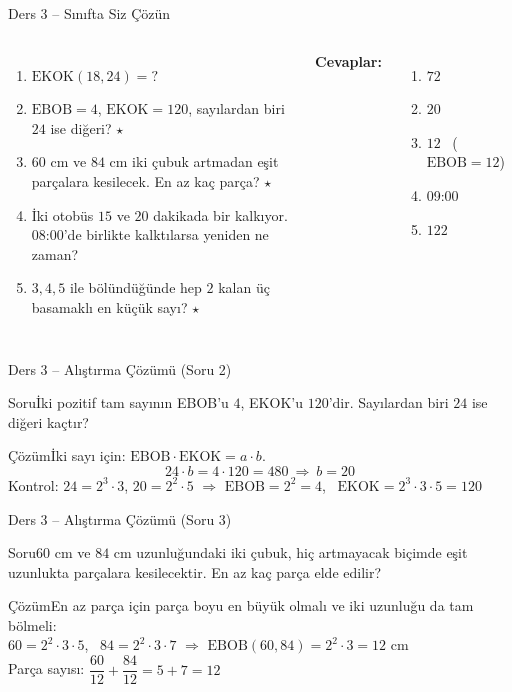 \documentclass[aspectratio=169,11pt,handout]{beamer}
\newcommand{\soru}[3]{%
\begin{frame}{#1}
  \begin{block}{Soru}\large #2\end{block}
  \pause
  \begin{exampleblock}{Çözüm}\large #3\end{exampleblock}
\end{frame}}
\begin{document}
\begin{frame}{Ders 3 -- Sınıfta Siz Çözün}
\begin{columns}[t]
\begin{enumerate}
\item \(\text{EKOK}(18,24)=?\)
\item \(\text{EBOB}=4\), \(\text{EKOK}=120\), sayılardan biri \(24\) ise diğeri? \(\star\)
\item \(60\) cm ve \(84\) cm iki çubuk artmadan eşit parçalara kesilecek. En az kaç parça? \(\star\)
\item İki otobüs \(15\) ve \(20\) dakikada bir kalkıyor. 08{:}00'de birlikte kalktılarsa yeniden ne zaman?
\item \(3,4,5\) ile bölündüğünde hep \(2\) kalan üç basamaklı en küçük sayı? \(\star\)
\end{enumerate}
\pause
\textbf{Cevaplar:}
\begin{enumerate}
\item \(72\)
\item \(20\)
\item \(12\) \ (\(\text{EBOB}=12\))
\item 09{:}00
\item \(122\)
\end{enumerate}
\end{columns}
\vspace{4pt}{\footnotesize \(\star\) işaretli soruların adım adım çözümü sonraki slaytlardadır.}
\end{frame}

\soru{Ders 3 -- Alıştırma Çözümü (Soru 2)}
{İki pozitif tam sayının EBOB'u \(4\), EKOK'u \(120\)'dir. Sayılardan biri \(24\) ise diğeri kaçtır?}
{İki sayı için: \(\text{EBOB}\cdot\text{EKOK}=a\cdot b\).
\[24\cdot b=4\cdot 120=480\ \Rightarrow\ b=20\]
Kontrol: \(24=2^3\cdot 3\), \(20=2^2\cdot 5\) \(\Rightarrow\) \(\text{EBOB}=2^2=4\), \ \(\text{EKOK}=2^3\cdot 3\cdot 5=120\) \checkmark}

\soru{Ders 3 -- Alıştırma Çözümü (Soru 3)}
{\(60\) cm ve \(84\) cm uzunluğundaki iki çubuk, hiç artmayacak biçimde eşit uzunlukta parçalara kesilecektir. En az kaç parça elde edilir?}
{En az parça için parça boyu en büyük olmalı ve iki uzunluğu da tam bölmeli:\\[3pt]
\(60=2^2\cdot 3\cdot 5\), \ \(84=2^2\cdot 3\cdot 7\) \(\Rightarrow\) \(\text{EBOB}(60,84)=2^2\cdot 3=12\) cm\\[3pt]
Parça sayısı: \(\dfrac{60}{12}+\dfrac{84}{12}=5+7=12\)}
\end{document}
